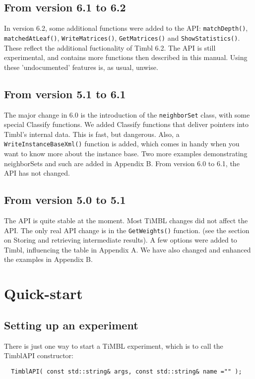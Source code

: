 \documentclass{report}
\begin{document}
\section{From version 6.1 to 6.2}

In version 6.2, some additional functions were added to the API:
{\tt matchDepth()}, {\tt matchedAtLeaf()}, {\tt WriteMatrices()}, {\tt GetMatrices()} and {\tt ShowStatistics()}. These reflect the additional fuctionality of Timbl 6.2.
The API is still experimental, and contains more functions then described in this manual. Using these 'undocumented' features is, as usual, unwise.

\section{From version 5.1 to 6.1}

The major change in 6.0 is the introduction of the {\tt neighborSet}
class, with some special Classify functions.  We added Classify
functions that deliver pointers into Timbl's internal data. This is
fast, but dangerous.  Also, a {\tt WriteInstanceBaseXml()} function is
added, which comes in handy when you want to know more about the
instance base.  Two more examples demonstrating neighborSets and such
are added in Appendix B. From version 6.0 to 6.1, the API has not changed.

\section{From version 5.0 to 5.1}

The API is quite stable at the moment. Most TiMBL changes did not
affect the API. The only real API change is in the {\tt GetWeights()}
function. (see the section on Storing and retrieving intermediate
results).  A few options were added to Timbl, influencing the table in
Appendix A. We have also changed and enhanced the examples in Appendix
B.

\chapter{Quick-start}
\section{Setting up an experiment}

There is just one way to start a TiMBL experiment, which is to call
the TimblAPI constructor:

\begin{footnotesize}
\begin{verbatim}
  TimblAPI( const std::string& args, const std::string& name ="" );
\end{verbatim}
\end{footnotesize}
\end{document}
